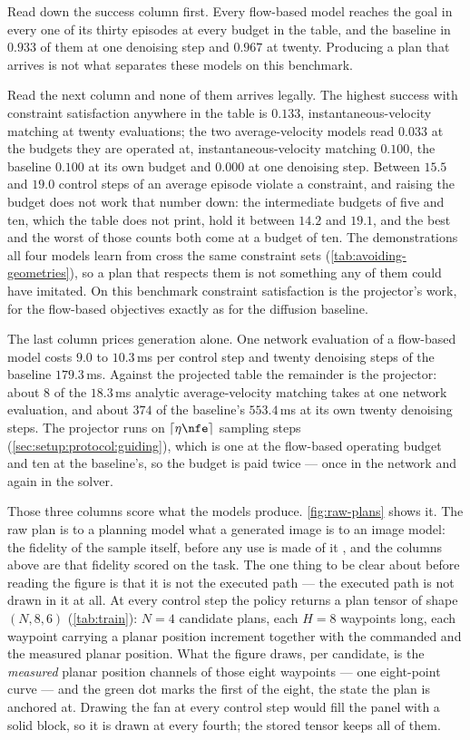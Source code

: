 Read down the success column first. Every flow-based model reaches the goal in every one of its thirty
episodes at every budget in the table, and the baseline in $0.933$ of them at one denoising step and
$0.967$ at twenty. Producing a plan that arrives is not what separates these models on this benchmark.

Read the next column and none of them arrives legally. The highest success with constraint satisfaction
anywhere in the table is $0.133$, instantaneous-velocity matching at twenty evaluations; the two
average-velocity models read $0.033$ at the budgets they are operated at, instantaneous-velocity
matching $0.100$, the baseline $0.100$ at its own budget and $0.000$ at one denoising step. Between
$15.5$ and $19.0$ control steps of an average episode violate a constraint, and raising the budget does
not work that number down: the intermediate budgets of five and ten, which the table does not print,
hold it between $14.2$ and $19.1$, and the best and the worst of those counts both come at a budget of ten.
The demonstrations all four models learn from cross the
same constraint sets (\autoref{tab:avoiding-geometries}), so a plan that respects them is not something
any of them could have imitated. On this benchmark constraint satisfaction is the projector's work, for
the flow-based objectives exactly as for the diffusion baseline.

The last column prices generation alone. One network evaluation of a flow-based model costs $9.0$ to
$10.3$\,ms per control step and twenty denoising steps of the baseline $179.3$\,ms. Against the projected
table the remainder is the projector: about $8$ of the $18.3$\,ms analytic average-velocity matching
takes at one network evaluation, and about $374$ of the baseline's $553.4$\,ms at its own twenty
denoising steps. The projector runs on
$\lceil \eta\nfe \rceil$ sampling steps (\autoref{sec:setup:protocol:guiding}), which is one at the
flow-based operating budget and ten at the baseline's, so the budget is paid twice --- once in the
network and again in the solver.

\FloatBarrier

Those three columns score what the models produce. \autoref{fig:raw-plans} shows it. The raw plan is to a
planning model what a generated image is to an image model: the fidelity of the sample itself, before any
use is made of it \parencite{ho2020denoising,lipman2023flow,geng2025meanflow}, and the columns above are
that fidelity scored on the task. The one thing to be clear about before reading the figure is that it is
not the executed path --- the executed path is not drawn in it
at all. At every control step the policy returns a plan tensor of shape $(N,8,6)$
(\autoref{tab:train}): $N=4$ candidate plans, each $H=8$ waypoints long, each waypoint carrying a planar
position increment together with the commanded and the measured planar position. What the figure draws,
per candidate, is the \emph{measured} planar position channels of those eight waypoints --- one
eight-point curve --- and the green dot marks the first of the eight, the state the plan is anchored at.
Drawing the fan at every control step would fill the panel with a solid block, so it is drawn at every
fourth; the stored tensor keeps all of them.

